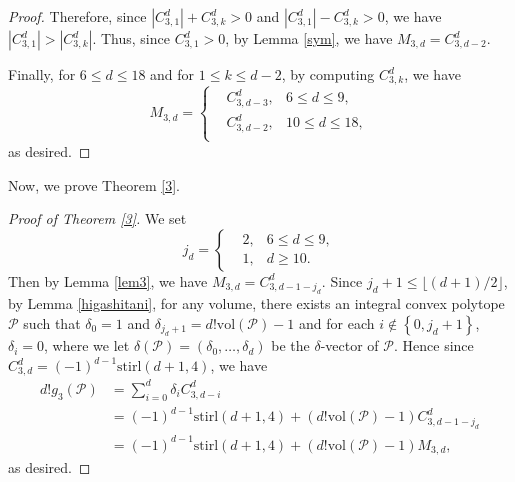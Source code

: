 \documentclass[12pt]{amsart}
\theoremstyle{definition}
\theoremstyle{remark}
\numberwithin{equation}{section}
\def\Pc{{\mathcal P}}
\begin{document}
\begin{proof}
Therefore, since $|C_{3,1}^d|+C_{3,k}^d>0$ and $|C_{3,1}^d|-C_{3,k}^d>0$, we have $|C_{3,1}^d|>|C_{3,k}^d|$.
Thus, since $C_{3,1}^d>0$, by Lemma \ref{sym}, we have $M_{3,d}=C_{3,d-2}^d$.

Finally, for $6 \leq d \leq 18$ and for $1 \leq k \leq d-2$, by computing $C_{3,k}^d$, we have
\begin{displaymath}
M_{3,d}= \left\{
\begin{aligned}
& C^d_{3,d-3}, & 6\leq d \leq 9, \\
& C^d_{3,d-2}, & 10 \leq d \leq 18,\\
\end{aligned}
\right.
\end{displaymath}
as desired.
\end{proof}
Now, we prove Theorem \ref{3}.
\begin{proof}[Proof of Theorem \ref{3}]
We set 
\begin{displaymath}
	j_d=\left\{
	\begin{aligned}
	&2, & 6 \leq d \leq 9,\\
	&1, &d \geq 10.
	\end{aligned}
\right.
\end{displaymath}
Then by Lemma \ref{lem3}, we have $M_{3,d}=C^d_{3,d-1-j_d}$.
Since $j_d+1 \leq \lfloor(d+1)/2\rfloor$, by Lemma \ref{higashitani}, for any volume, there exists an integral convex polytope $\Pc$ such that $\delta_0=1$ and $\delta_{j_d+1}=d!\text{vol}(\Pc)-1$ and for each $i \notin \left\{0,j_d+1\right\}$, $\delta_i=0$,
where we let $\delta(\Pc)=(\delta_0,\ldots,\delta_d)$ be the $\delta$-vector of $\Pc.$
Hence since $C_{3,d}^d=(-1)^{d-1}\text{stirl}(d+1,4)$, we have
\begin{displaymath}
\begin{aligned}
 d!g_3(\Pc)&=\sum\limits_{i=0}^{d}\delta_iC_{3,d-i}^d\\
 &=(-1)^{d-1}\text{stirl}(d+1,4)+(d!\text{vol}(\Pc)-1)C^d_{3,d-1-j_d}\\
 &=(-1)^{d-1}\text{stirl}(d+1,4)+(d!\text{vol}(\Pc)-1)M_{3,d},
\end{aligned}
\end{displaymath}
as desired.
\end{proof}
\end{document}
